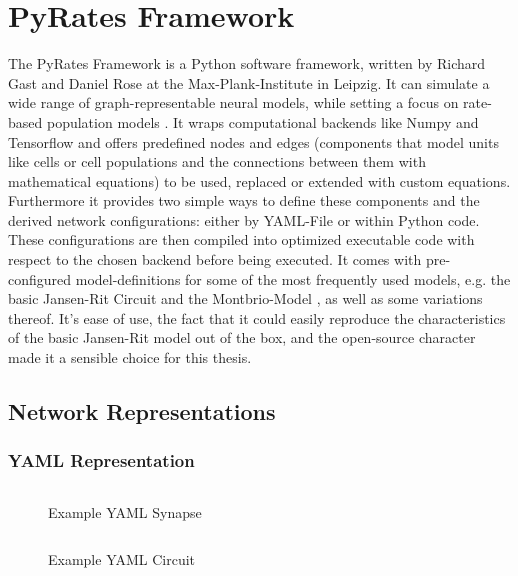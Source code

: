 
\section{PyRates Framework}
The PyRates Framework is a Python software framework, written by Richard Gast and Daniel Rose at the Max-Plank-Institute in Leipzig. It can simulate a wide range of graph-representable neural models, while setting a focus on rate-based population models \parencite{gast_pyratespython_2019}. It wraps computational backends like Numpy and Tensorflow and offers predefined nodes and edges (components that model units like cells or cell populations and the connections between them with mathematical equations) to be used, replaced or extended with custom equations. Furthermore it provides two simple ways to define these components and the derived network configurations: either by YAML-File or within Python code. These configurations are then compiled into optimized executable code with respect to the chosen backend before being executed.
It comes with pre-configured model-definitions for some of the most frequently used models, e.g. the basic Jansen-Rit Circuit \parencite{jansen_electroencephalogram_1995} and the Montbrio-Model \parencite{montbrio_macroscopic_2015}, as well as some variations thereof. It's ease of use, the fact that it could easily reproduce the characteristics of the basic Jansen-Rit model out of the box, and the open-source character made it a sensible choice for this thesis.
\subsection{Network Representations}

\subsubsection{YAML Representation}


\begin{figure}[H]
	\inputminted[frame=lines, linenos, fontsize=\footnotesize, baselinestretch=1.2, bgcolor=LightGray, tabsize=4]
	{yaml}{Chapters/Chapter_02_Technical_Concepts/code/yaml_synapse.yaml}
	
	\caption{Example YAML Synapse}
\end{figure}

\begin{figure}[H]
	\inputminted[frame=lines, linenos, fontsize=\footnotesize, baselinestretch=1.2, bgcolor=LightGray, tabsize=4]
	{yaml}{Chapters/Chapter_02_Technical_Concepts/code/yaml_circuit.yaml}

	\caption{Example YAML Circuit}
\end{figure}
